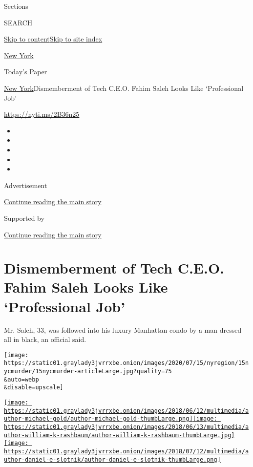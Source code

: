 Sections

SEARCH

\protect\hyperlink{site-content}{Skip to
content}\protect\hyperlink{site-index}{Skip to site index}

\href{https://www.nytimes3xbfgragh.onion/section/nyregion}{New York}

\href{https://myaccount.nytimes3xbfgragh.onion/auth/login?response_type=cookie\&client_id=vi}{}

\href{https://www.nytimes3xbfgragh.onion/section/todayspaper}{Today's
Paper}

\href{/section/nyregion}{New York}\textbar{}Dismemberment of Tech C.E.O.
Fahim Saleh Looks Like `Professional Job'

\url{https://nyti.ms/2B36n25}

\begin{itemize}
\item
\item
\item
\item
\item
\end{itemize}

Advertisement

\protect\hyperlink{after-top}{Continue reading the main story}

Supported by

\protect\hyperlink{after-sponsor}{Continue reading the main story}

\hypertarget{dismemberment-of-tech-ceo-fahim-saleh-looks-like-professional-job}{%
\section{Dismemberment of Tech C.E.O. Fahim Saleh Looks Like
`Professional
Job'}\label{dismemberment-of-tech-ceo-fahim-saleh-looks-like-professional-job}}

Mr. Saleh, 33, was followed into his luxury Manhattan condo by a man
dressed all in black, an official said.

\texttt{[image: https://static01.graylady3jvrrxbe.onion/images/2020/07/15/nyregion/15nycmurder/15nycmurder-articleLarge.jpg?quality=75\\\&auto=webp\\\&disable=upscale]}

\href{https://www.nytimes3xbfgragh.onion/by/michael-gold}{\texttt{[image: https://static01.graylady3jvrrxbe.onion/images/2018/06/12/multimedia/author-michael-gold/author-michael-gold-thumbLarge.png]}}\href{https://www.nytimes3xbfgragh.onion/by/william-k-rashbaum}{\texttt{[image: https://static01.graylady3jvrrxbe.onion/images/2018/06/13/multimedia/author-william-k-rashbaum/author-william-k-rashbaum-thumbLarge.jpg]}}\href{https://www.nytimes3xbfgragh.onion/by/daniel-e-slotnik}{\texttt{[image: https://static01.graylady3jvrrxbe.onion/images/2018/07/12/multimedia/author-daniel-e-slotnik/author-daniel-e-slotnik-thumbLarge.png]}}

